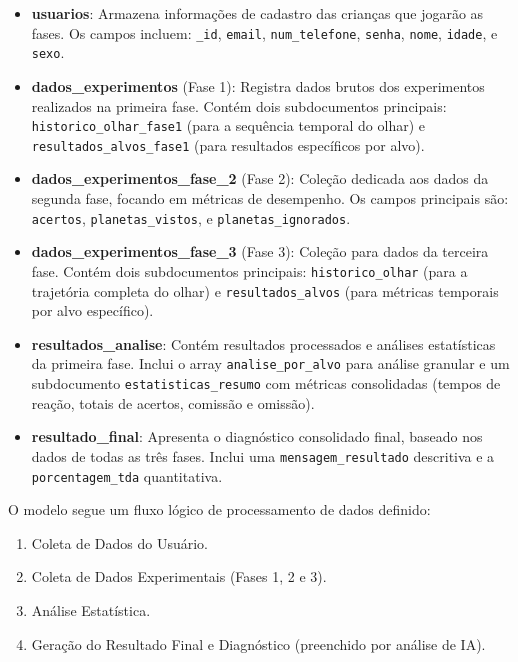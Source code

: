 \documentclass[
  a4paper,%
  12pt,%
  english,%
  brazilian,%
]{article}
\begin{document}
\begin{itemize}
    \item \textbf{usuarios}: Armazena informações de cadastro das crianças que jogarão as fases. Os campos incluem: \texttt{\_id}, \texttt{email}, \texttt{num\_telefone}, \texttt{senha}, \texttt{nome}, \texttt{idade}, e \texttt{sexo}.

    \item \textbf{dados\_experimentos} (Fase 1): Registra dados brutos dos experimentos realizados na primeira fase. Contém dois subdocumentos principais: \texttt{historico\_olhar\_fase1} (para a sequência temporal do olhar) e \texttt{resultados\_alvos\_fase1} (para resultados específicos por alvo).

    \item \textbf{dados\_experimentos\_fase\_2} (Fase 2): Coleção dedicada aos dados da segunda fase, focando em métricas de desempenho. Os campos principais são: \texttt{acertos}, \texttt{planetas\_vistos}, e \texttt{planetas\_ignorados}.

    \item \textbf{dados\_experimentos\_fase\_3} (Fase 3): Coleção para dados da terceira fase. Contém dois subdocumentos principais: \texttt{historico\_olhar} (para a trajetória completa do olhar) e \texttt{resultados\_alvos} (para métricas temporais por alvo específico).

    \item \textbf{resultados\_analise}: Contém resultados processados e análises estatísticas da primeira fase. Inclui o array \texttt{analise\_por\_alvo} para análise granular e um subdocumento \texttt{estatisticas\_resumo} com métricas consolidadas (tempos de reação, totais de acertos, comissão e omissão).

    \item \textbf{resultado\_final}: Apresenta o diagnóstico consolidado final, baseado nos dados de todas as três fases. Inclui uma \texttt{mensagem\_resultado} descritiva e a \texttt{porcentagem\_tda} quantitativa.
\end{itemize}


O modelo segue um fluxo lógico de processamento de dados definido:
\begin{enumerate}
    \item Coleta de Dados do Usuário.
    \item Coleta de Dados Experimentais (Fases 1, 2 e 3).
    \item Análise Estatística.
    \item Geração do Resultado Final e Diagnóstico (preenchido por análise de IA).
\end{enumerate}
\end{document}
